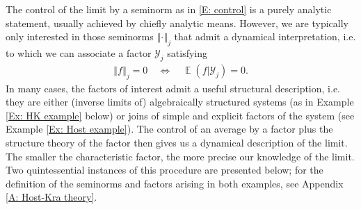 \documentclass[11pt]{amsart}
\theoremstyle{definition}
\DeclareMathOperator*{\E}{\mathbb{E}}
\newcommand{\CY}{{\mathcal Y}}
\newcommand{\norm}[1]{\left\Vert #1\right\Vert}
\newcommand{\1}{{\mathbf{1}}}
\begin{document}
The control of the limit by a seminorm as in \eqref{E: control} is a purely analytic statement, usually achieved by chiefly analytic means. However, we are typically only interested in those seminorms $\norm{\cdot}_j$ that admit a dynamical interpretation, i.e. to which we can associate a factor $\CY_j$ satisfying
\begin{align*}
\norm{f}_j = 0 \quad \Longleftrightarrow \quad \E(f|\CY_j) = 0.
\end{align*} 
In many cases, the factors of interest admit a useful structural description, i.e. they are either (inverse limits of) algebraically structured systems (as in Example \ref{Ex: HK example} below) or joins of simple and explicit factors of the system (see Example \ref{Ex: Host example}). The control of an average by a factor plus the structure theory of the factor then gives us a dynamical description of the limit. The smaller the characteristic factor, the more precise our knowledge of the limit. Two quintessential instances of this procedure are presented below; for the definition of the seminorms and factors arising in both examples, see Appendix \ref{A: Host-Kra theory}.
\end{document}
